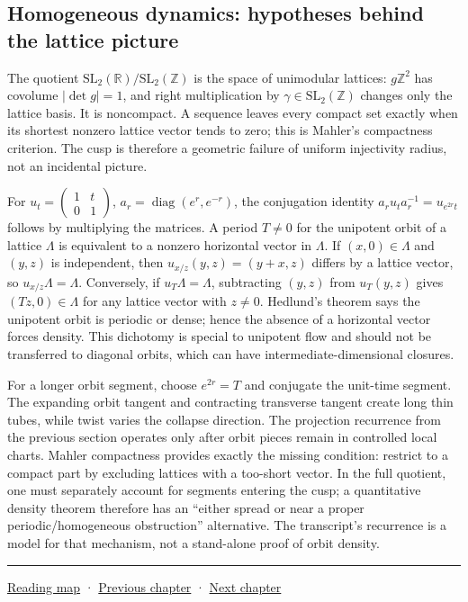 \subsection{Homogeneous dynamics: hypotheses behind the lattice picture}\label{04-visual-computing-ii-ch033-homogeneous-dynamics-hypotheses-behind-the-lattice-picture}

The quotient \(\mathrm{SL}_2(\mathbb R)/\mathrm{SL}_2(\mathbb Z)\) is the space of unimodular lattices: \(g\mathbb Z^2\) has covolume \(|\det g|=1\), and right multiplication by \(\gamma\in\mathrm{SL}_2(\mathbb Z)\) changes only the lattice basis. It is noncompact. A sequence leaves every compact set exactly when its shortest nonzero lattice vector tends to zero; this is Mahler's compactness criterion. The cusp is therefore a geometric failure of uniform injectivity radius, not an incidental picture.

For \(u_t=\begin{pmatrix}1&t\\0&1\end{pmatrix}\), \(a_r=\operatorname{diag}(e^r,e^{-r})\), the conjugation identity \(a_ru_ta_r^{-1}=u_{e^{2r}t}\) follows by multiplying the matrices. A period \(T\ne0\) for the unipotent orbit of a lattice \(\Lambda\) is equivalent to a nonzero horizontal vector in \(\Lambda\). If \((x,0)\in\Lambda\) and \((y,z)\) is independent, then \(u_{x/z}(y,z)=(y+x,z)\) differs by a lattice vector, so \(u_{x/z}\Lambda=\Lambda\). Conversely, if \(u_T\Lambda=\Lambda\), subtracting \((y,z)\) from \(u_T(y,z)\) gives \((Tz,0)\in\Lambda\) for any lattice vector with \(z\ne0\). Hedlund's theorem says the unipotent orbit is periodic or dense; hence the absence of a horizontal vector forces density. This dichotomy is special to unipotent flow and should not be transferred to diagonal orbits, which can have intermediate-dimensional closures.

For a longer orbit segment, choose \(e^{2r}=T\) and conjugate the unit-time segment. The expanding orbit tangent and contracting transverse tangent create long thin tubes, while twist varies the collapse direction. The projection recurrence from the previous section operates only after orbit pieces remain in controlled local charts. Mahler compactness provides exactly the missing condition: restrict to a compact part by excluding lattices with a too-short vector. In the full quotient, one must separately account for segments entering the cusp; a quantitative density theorem therefore has an ``either spread or near a proper periodic/homogeneous obstruction'' alternative. The transcript's recurrence is a model for that mechanism, not a stand-alone proof of orbit density.

\begin{center}\rule{0.5\linewidth}{0.5pt}\end{center}

\hyperref[volume-reading-map]{Reading map} · \hyperref[04-visual-computing-ii-ch032-pose-estimation-and-robust-fitting]{Previous chapter} · \hyperref[04-visual-computing-ii-ch034-learned-3d-shapes-and-scene-representations]{Next chapter}
